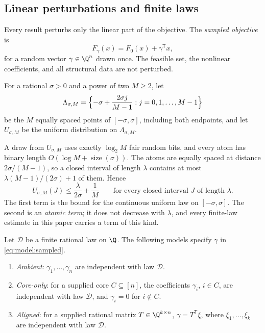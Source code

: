 \subsection{Linear perturbations and finite laws}\label{sec:model:noise}

Every result perturbs only the linear part of the objective. The
\emph{sampled objective} is
\begin{equation}\label{eq:model:sampled}
 F_\gamma(x)=F_0(x)+\gamma^{\mathsf T}x,
\end{equation}
for a random vector $\gamma\in\Q^n$ drawn once. The feasible set, the
nonlinear coefficients, and all structural data are not perturbed.

\begin{definition}\label{def:model:grid}
For a rational $\sigma>0$ and a power of two $M\ge2$, let
\[
 \Lambda_{\sigma,M}=\Bigl\{-\sigma+\frac{2\sigma j}{M-1}:j=0,1,\ldots,M-1\Bigr\}
\]
be the $M$ equally spaced points of $[-\sigma,\sigma]$, including both
endpoints, and let $U_{\sigma,M}$ be the uniform distribution on
$\Lambda_{\sigma,M}$.
\end{definition}

A draw from $U_{\sigma,M}$ uses exactly $\log_2M$ fair random bits, and every
atom has binary length $O(\log M+\operatorname{size}(\sigma))$. The atoms
are equally spaced at distance $2\sigma/(M-1)$, so a closed interval of
length $\lambda$ contains at most $\lambda(M-1)/(2\sigma)+1$ of them. Hence
\begin{equation}\label{eq:model:interval}
 U_{\sigma,M}(J)\le\frac{\lambda}{2\sigma}+\frac1M
 \qquad\text{for every closed interval $J$ of length $\lambda$.}
\end{equation}
The first term is the bound for the continuous uniform law on
$[-\sigma,\sigma]$. The second is an \emph{atomic term}; it does not
decrease with $\lambda$, and every finite-law estimate in this paper carries
a term of this kind.

\begin{definition}\label{def:model:perturbation}
Let $\mathcal D$ be a finite rational law on $\Q$. The following models
specify $\gamma$ in \eqref{eq:model:sampled}.
\begin{enumerate}[label=(\roman*)]
\item \emph{Ambient}: $\gamma_1,\ldots,\gamma_n$ are independent with law
$\mathcal D$.
\item \emph{Core-only}: for a supplied core $C\subseteq[n]$, the coefficients
$\gamma_i$, $i\in C$, are independent with law $\mathcal D$, and
$\gamma_i=0$ for $i\notin C$.
\item \emph{Aligned}: for a supplied rational matrix $T\in\Q^{k\times n}$,
$\gamma=T^{\mathsf T}\xi$, where $\xi_1,\ldots,\xi_k$ are independent with
law $\mathcal D$.
\end{enumerate}
\end{definition}

